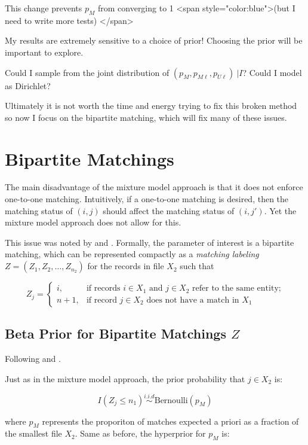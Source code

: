 \documentclass[11pt,reqno]{amsart}
\begin{document}
This change prevents $p_M$ from converging to 1 <span style="color:blue">(but I need to write more tests) </span>

My results are extremely sensitive to a choice of prior! Choosing the prior will be important to explore. 

Could I sample from the joint distribution of $(p_M, p_{M\ell}, p_{U\ell})\ | I$?  Could I model as Dirichlet?

Ultimately it is not worth the time and energy trying to fix this broken method so now I focus on the bipartite matching, which will fix many of these issues.

\section{Bipartite Matchings}

The main disadvantage of the mixture model approach is that it does not enforce one-to-one matching.  Intuitively, if a one-to-one matching is desired, then the matching status of $(i,j)$ should affect the matching status of $(i,j')$.  Yet the mixture model approach does not allow for this.  

This issue was noted by \cite{larsen_2005} and \cite{sadinle_2017}.  Formally, the parameter of interest is a bipartite matching, which can be represented compactly as a \textit{matching labeling} $Z= (Z_1, Z_2,\dots, Z_{n_2})$ for the records in file $X_2$ such that

\[ Z_j = \begin{cases} i, & \text{if records $i\in X_1$ and $j\in X_2$ refer to the same entity;} \\
				n+1, & \text{if record $j\in X_2$ does not have a match in $X_1$} \end{cases} \]

\subsection{Beta Prior for Bipartite Matchings $Z$}

Following \cite{larsen_2005} and \cite{sadinle_2017}.

Just as in the mixture model approach, the prior probability that $j \in X_2$ is:

$$ I(Z_j \leq n_1)  \overset{i.i.d}{\sim} \text{Bernoulli}(p_M)$$

where $p_M$ represents the proporiton of matches expected a priori as a fraction of the smallest file $X_2$.  Same as before, the hyperprior for $p_M$ is:
\end{document}
